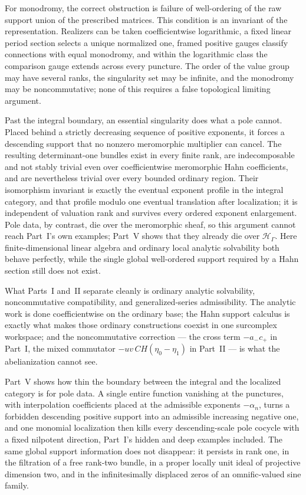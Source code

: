 \documentclass[11pt,letterpaper]{article}
\theoremstyle{definition}
\theoremstyle{remark}
\newcommand{\HH}{\mathscr H_\Gamma}
\numberwithin{equation}{section}
\begin{document}
For monodromy, the correct obstruction is failure of well-ordering of the raw
support union of the prescribed matrices. This condition is an invariant of
the representation. Realizers
can be taken coefficientwise logarithmic, a fixed linear period section
selects a unique normalized one, framed positive gauges classify connections
with equal monodromy, and within the logarithmic class the comparison gauge
extends across every puncture. The order of the value group may have several
ranks, the singularity set may be infinite, and the monodromy may be
noncommutative; none of this requires a false topological limiting argument.

Past the integral boundary, an essential singularity does what a pole cannot.
Placed behind a strictly decreasing sequence of positive exponents, it forces a
descending support that no nonzero meromorphic multiplier can cancel. The
resulting determinant-one bundles exist in every finite rank, are
indecomposable and not stably trivial even over coefficientwise meromorphic
Hahn coefficients, and are nevertheless trivial over every bounded ordinary
region. Their isomorphism invariant is exactly the eventual exponent profile in
the integral category, and that profile modulo one eventual translation after
localization; it is independent of valuation rank and survives every ordered
exponent enlargement. Pole data, by contrast, die over the meromorphic sheaf,
so this argument cannot reach Part~I's own examples; Part~V shows that they
already die over $\HH$.
Here finite-dimensional linear algebra and ordinary local analytic solvability
both behave perfectly, while the single global well-ordered support required by
a Hahn section still does not exist.

What Parts~I and~II separate cleanly is ordinary analytic solvability,
noncommutative compatibility, and generalized-series admissibility. The
analytic work is done coefficientwise on the ordinary base; the Hahn support
calculus is exactly what makes those ordinary constructions coexist in one
surcomplex workspace; and the noncommutative correction --- the cross term
$-a_-c_+$ in Part~I, the mixed commutator $-uv\,CH(\eta_0-\eta_1)$ in Part~II
--- is what the abelianization cannot see.

Part~V shows how thin the boundary between the integral and the localized
category is for pole data. A single entire function vanishing at the punctures,
with interpolation coefficients placed at the admissible exponents
$-\alpha_n$, turns a forbidden descending positive support into an admissible
increasing negative one, and one monomial localization then kills every
descending-scale pole cocycle with a fixed nilpotent direction, Part~I's hidden
and deep examples included. The same global support information does not
disappear: it persists in rank one, in the filtration of a free rank-two
bundle, in a proper locally unit ideal of projective dimension two, and in the
infinitesimally displaced zeros of an omnific-valued sine family.
\end{document}
